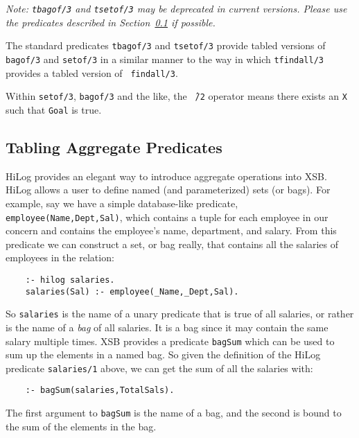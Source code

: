 \begin{description}

    {\em Note: {\tt tbagof/3} and {\tt tsetof/3} may be deprecated in
    current versions.  Please use the predicates described in
    Section~\ref{tabling_aggregate_predicates} if possible.}

The standard predicates {\tt tbagof/3} and {\tt tsetof/3} provide
tabled versions of {\tt bagof/3} and {\tt setof/3} in a similar manner
to the way in which {\tt tfindall/3} provides a tabled version of {\tt
findall/3}.

%
Within {\tt setof/3}, {\tt bagof/3} and the like, the {\tt \^\ /2}
operator means there exists an {\tt X} such that {\tt Goal} is true.

\end{description}

\subsection{Tabling Aggregate Predicates}\label{tabling_aggregate_predicates}
 

HiLog provides an elegant way to introduce aggregate operations into
XSB.  HiLog allows a user to define named (and parameterized) sets (or
bags).  For example, say we have a simple database-like predicate,
\verb|employee(Name,Dept,Sal)|, which contains a tuple for each
employee in our concern and contains the employee's name, department,
and salary.  From this predicate we can construct a set, or bag
really, that contains all the salaries of employees in the relation:
\begin{verbatim}
    :- hilog salaries.
    salaries(Sal) :- employee(_Name,_Dept,Sal).
\end{verbatim}
So \verb|salaries| is the name of a unary predicate that is true of
all salaries, or rather is the name of a {\em bag} of all salaries.
It is a bag since it may contain the same salary multiple times.
XSB provides a predicate \verb|bagSum| which can be used to
sum up the elements in a named bag.  So given the definition of the
HiLog predicate \verb|salaries/1| above, we can get the sum of all the
salaries with:
\begin{verbatim}
    :- bagSum(salaries,TotalSals).
\end{verbatim}
The first argument to \verb|bagSum| is the name of a bag, and the
second is bound to the sum of the elements in the bag.

